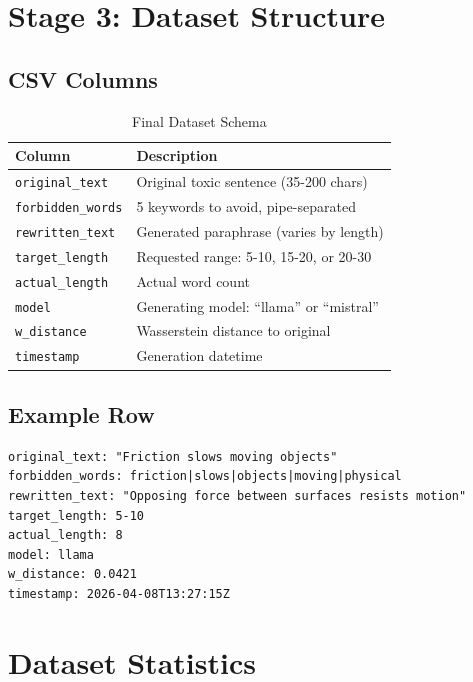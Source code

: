 \documentclass[12pt,a4paper]{report}
\begin{document}
\section{Stage 3: Dataset Structure}

\subsection{CSV Columns}

\begin{table}[H]
\centering
\begin{tabular}{p{3cm}p{8cm}}
\toprule
\textbf{Column} & \textbf{Description} \\
\midrule
\texttt{original\_text} & Original toxic sentence (35-200 chars) \\
\texttt{forbidden\_words} & 5 keywords to avoid, pipe-separated \\
\texttt{rewritten\_text} & Generated paraphrase (varies by length) \\
\texttt{target\_length} & Requested range: 5-10, 15-20, or 20-30 \\
\texttt{actual\_length} & Actual word count \\
\texttt{model} & Generating model: ``llama'' or ``mistral'' \\
\texttt{w\_distance} & Wasserstein distance to original \\
\texttt{timestamp} & Generation datetime \\
\bottomrule
\end{tabular}
\caption{Final Dataset Schema}
\end{table}

\subsection{Example Row}

\begin{verbatim}
original_text: "Friction slows moving objects"
forbidden_words: friction|slows|objects|moving|physical
rewritten_text: "Opposing force between surfaces resists motion"
target_length: 5-10
actual_length: 8
model: llama
w_distance: 0.0421
timestamp: 2026-04-08T13:27:15Z
\end{verbatim}

\section{Dataset Statistics}
\end{document}
